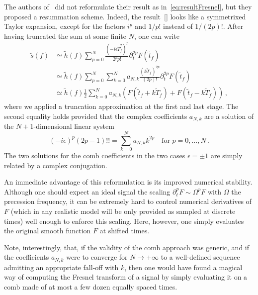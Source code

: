 \documentclass[aps,showpacs,%
prd,superscriptaddress,nofootinbib]{revtex4}
\newcommand{\be}{\begin{equation}}
\newcommand{\ee}{\end{equation}}
\newcommand{\nn}{\nonumber}
\newcommand{\tf}{\tilde{t}_{f}}
\newcommand{\Tf}{\tilde{T}_{f}}
\begin{document}
The authors of~\cite{} did not reformulate their result as in~\eqref{eq:resultFresnel}, but they proposed  a resummation scheme. Indeed, the result~\eqref{} looks like a symmetrixed Taylor expansion, except for the factors $i^{p}$ and $1/p!$ instead of $1/(2p)!$. After having truncated the sum at some finite $N$, one can write
%
\begin{align}\label{eq:resum}
	\tilde{s}(f) &\simeq \tilde{h}(f) \sum\limits_{p = 0}^{N} \frac{(-i\epsilon\Tf^{2})^{p}}{2^{p}p!} \partial_{t}^{2p}F(\tf) \nn\\
	&\simeq \tilde{h}(f) \sum\limits_{p= 0}^{N} \sum\limits_{k=0}^{N} a_{N,k}\frac{(k\Tf)^{2p}}{(2p)!}  \partial_{t}^{2p}F(\tf) \nn\\
	&\simeq \tilde{h}(f) \frac{1}{2}\sum\limits_{k=0}^{N} a_{N,k} \left( F(\tf + k\Tf) + F(\tf-k\Tf) \right)\,,
\end{align}
%
where we applied a truncation approximation at the first and last stage. The second equality holds provided that the complex coefficients $a_{N,k}$ are a solution of the $N+1$-dimensional linear system
%
\be
	(-i\epsilon)^{p} (2p-1)!! = \sum\limits_{k=0}^{N} a_{N,k} k^{2p} \quad \text{for } p=0,\dots,N \,.
\ee
%
The two solutions for the comb coefficients in the two cases $\epsilon = \pm 1$ are simply related by a complex conjugation.

An immediate advantage of this reformulation is its improved numerical stability. Although one should expect an ideal signal the scaling $\partial_{t}^{p} F \sim \Omega^{p} F$ with $\Omega$ the precession frequency, it can be extremely hard to control numerical derivatives of $F$ (which in any realistic model will be only provided as sampled at discrete times) well enough to enforce this scaling. Here, however, one simply evaluates the original smooth function $F$ at shifted times.

Note, interestingly, that, if the validity of the comb approach was generic, and if the coefficients $a_{N,k}$ were to converge for $N\rightarrow +\infty$ to a well-defined sequence admitting an appropriate fall-off with $k$, then one would have found a magical way of computing the Fresnel transform of a signal by simply evaluating it on a comb made of at most a few dozen equally spaced times.
\end{document}
